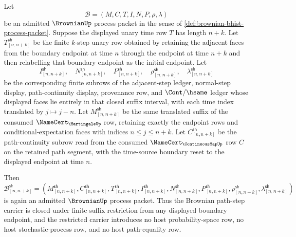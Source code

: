 \begin{theorem}
\label{thm:brownian-finite-suffix-carrier-restriction}
Let
$$
\mathcal{B}=(M,C,T,I,N,P,\rho,\lambda)
$$
be an admitted $\BrownianUp$ process packet in the sense of
\autoref{def:brownian-bhist-process-packet}. Suppose the displayed unary time
row $T$ has length $n+k$. Let $T_{[n,n+k]}^{\mathsf{sh}}$ be the finite
$k$-step unary row obtained by retaining the adjacent faces from the boundary
endpoint at time $n$ through the endpoint at time $n+k$ and then relabelling
that boundary endpoint as the initial endpoint. Let
$$
I_{[n,n+k]}^{\mathsf{sh}},\quad
N_{[n,n+k]}^{\mathsf{sh}},\quad
P_{[n,n+k]}^{\mathsf{sh}},\quad
\rho_{[n,n+k]}^{\mathsf{sh}},\quad
\lambda_{[n,n+k]}^{\mathsf{sh}}
$$
be the corresponding finite subrows of the adjacent-step ledger,
normal-step display, path-continuity display, provenance row, and
$\Cont/\hsame$ ledger whose displayed faces lie entirely in that closed
suffix interval, with each time index translated by $j\mapsto j-n$. Let
$M_{[n,n+k]}^{\mathsf{sh}}$ be the same translated suffix of the consumed
$\NameCert_{\MartingaleUp}$ row, retaining exactly the endpoint rows and
conditional-expectation faces with indices $n\leq j\leq n+k$. Let
$C_{[n,n+k]}^{\mathsf{sh}}$ be the path-continuity subrow read from the
consumed $\NameCert_{\ContinuousMapUp}$ row $C$ on the retained path segment,
with the time-source boundary reset to the displayed endpoint at time $n$.

Then
$$
\mathcal{B}_{[n,n+k]}^{\mathsf{sh}}
=
(M_{[n,n+k]}^{\mathsf{sh}},
 C_{[n,n+k]}^{\mathsf{sh}},
 T_{[n,n+k]}^{\mathsf{sh}},
 I_{[n,n+k]}^{\mathsf{sh}},
 N_{[n,n+k]}^{\mathsf{sh}},
 P_{[n,n+k]}^{\mathsf{sh}},
 \rho_{[n,n+k]}^{\mathsf{sh}},
 \lambda_{[n,n+k]}^{\mathsf{sh}})
$$
is again an admitted $\BrownianUp$ process packet. Thus the Brownian path-step
carrier is closed under finite suffix restriction from any displayed boundary
endpoint, and the restricted carrier introduces no host probability-space row,
no host stochastic-process row, and no host path-equality row.
\end{theorem}
